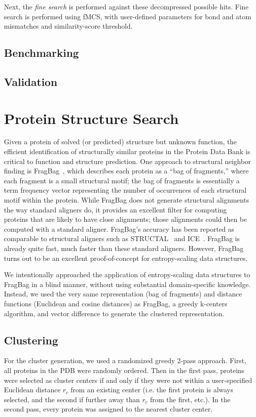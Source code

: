 \documentclass{amsbook}
\theoremstyle{definition}
\theoremstyle{remark}
\numberwithin{equation}{section}
\begin{document}
Next, the \emph{fine search} is performed against these decompressed possible hits.
Fine search is performed using fMCS, with user-defined parameters for bond and atom mismatches and
similarity-score threshold.

\subsection*{Benchmarking}

\subsection*{Validation}

\section*{Protein Structure Search}

Given a protein of solved (or predicted) structure but unknown function, the efficient identification
of structurally similar proteins in the Protein Data Bank is critical to function and structure prediction.
One approach to structural neighbor finding is FragBag~\cite{budowski2010fragbag}, which describes each protein as a
``bag of fragments,'' where each fragment is a small structural motif; the bag of fragments is essentially
a term frequency vector representing the number of occurrences of each structural motif within the protein.
While FragBag does not generate structural alignments the way standard aligners do, it provides an excellent
filter for computing proteins that are likely to have close alignments; those alignments could then be computed
with a standard aligner.
FragBag's accuracy has been reported as comparable to structural aligners such as STRUCTAL~\cite{blah} and
ICE~\cite{blah}.
FragBag is already quite fast, much faster than these standard aligners.
However, FragBag turns out to be an excellent proof-of-concept for entropy-scaling data structures.

We intentionally approached the application of entropy-scaling data structures to FragBag in a blind manner,
without using substantial domain-specific knowledge.
Instead, we used the very same representation (bag of fragments) and distance functions (Euclidean and cosine distances)
as FragBag, a greedy k-centers algorithm, and vector difference to generate the clustered representation.

\subsection*{Clustering}
For the cluster generation, we used a randomized greedy 2-pass approach.
First, all proteins in the PDB were randomly ordered.
Then in the first pass, proteins were selected as cluster centers if and only if they were not within a user-specified Euclidean distance $r_c$ from an existing center (i.e. the first protein is always selected, and the second if further away than $r_c$ from the first, etc.).
In the second pass, every protein was assigned to the nearest cluster center.
\end{document}
